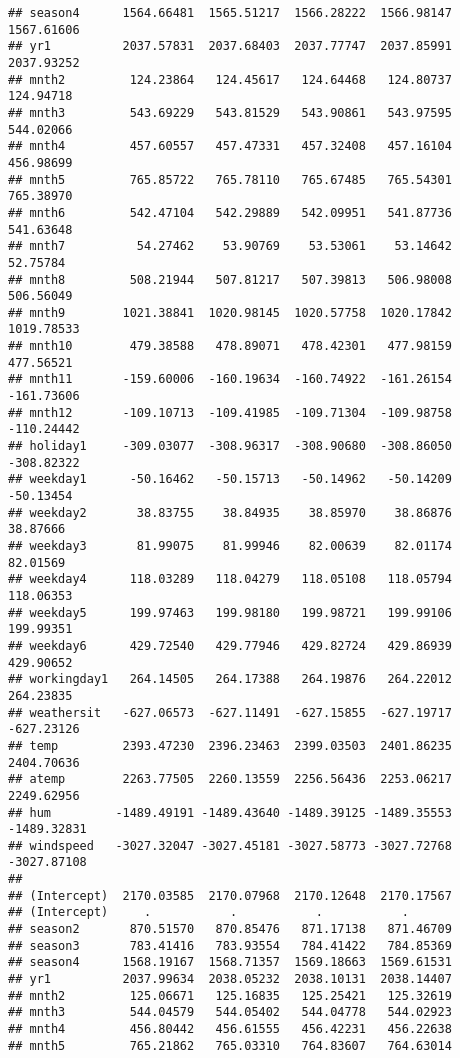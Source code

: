 \documentclass[]{article}
\begin{document}
\begin{verbatim}
## season4      1564.66481  1565.51217  1566.28222  1566.98147  1567.61606
## yr1          2037.57831  2037.68403  2037.77747  2037.85991  2037.93252
## mnth2         124.23864   124.45617   124.64468   124.80737   124.94718
## mnth3         543.69229   543.81529   543.90861   543.97595   544.02066
## mnth4         457.60557   457.47331   457.32408   457.16104   456.98699
## mnth5         765.85722   765.78110   765.67485   765.54301   765.38970
## mnth6         542.47104   542.29889   542.09951   541.87736   541.63648
## mnth7          54.27462    53.90769    53.53061    53.14642    52.75784
## mnth8         508.21944   507.81217   507.39813   506.98008   506.56049
## mnth9        1021.38841  1020.98145  1020.57758  1020.17842  1019.78533
## mnth10        479.38588   478.89071   478.42301   477.98159   477.56521
## mnth11       -159.60006  -160.19634  -160.74922  -161.26154  -161.73606
## mnth12       -109.10713  -109.41985  -109.71304  -109.98758  -110.24442
## holiday1     -309.03077  -308.96317  -308.90680  -308.86050  -308.82322
## weekday1      -50.16462   -50.15713   -50.14962   -50.14209   -50.13454
## weekday2       38.83755    38.84935    38.85970    38.86876    38.87666
## weekday3       81.99075    81.99946    82.00639    82.01174    82.01569
## weekday4      118.03289   118.04279   118.05108   118.05794   118.06353
## weekday5      199.97463   199.98180   199.98721   199.99106   199.99351
## weekday6      429.72540   429.77946   429.82724   429.86939   429.90652
## workingday1   264.14505   264.17388   264.19876   264.22012   264.23835
## weathersit   -627.06573  -627.11491  -627.15855  -627.19717  -627.23126
## temp         2393.47230  2396.23463  2399.03503  2401.86235  2404.70636
## atemp        2263.77505  2260.13559  2256.56436  2253.06217  2249.62956
## hum         -1489.49191 -1489.43640 -1489.39125 -1489.35553 -1489.32831
## windspeed   -3027.32047 -3027.45181 -3027.58773 -3027.72768 -3027.87108
##                                                            
## (Intercept)  2170.03585  2170.07968  2170.12648  2170.17567
## (Intercept)     .           .           .           .      
## season2       870.51570   870.85476   871.17138   871.46709
## season3       783.41416   783.93554   784.41422   784.85369
## season4      1568.19167  1568.71357  1569.18663  1569.61531
## yr1          2037.99634  2038.05232  2038.10131  2038.14407
## mnth2         125.06671   125.16835   125.25421   125.32619
## mnth3         544.04579   544.05402   544.04778   544.02923
## mnth4         456.80442   456.61555   456.42231   456.22638
## mnth5         765.21862   765.03310   764.83607   764.63014

\end{verbatim}
\end{document}
